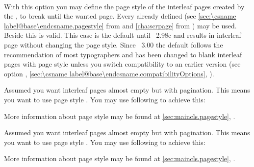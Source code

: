 \begin{Declaration}
  \\
\end{Declaration}%
%
%
With this option  you may define the page style of the
interleaf pages created by the , to break until the
wanted page. Every already defined  (see
\autoref{sec:\csname label@base\endcsname.pagestyle} from
 and
\autoref{cha:scrpage} from ) may be used. Beside this
 is valid. This case is the default
until \KOMAScript~2.98c and results in interleaf page without changing the
page style. Since \KOMAScript~3.00 the default
follows the recommendation of most typographers and has been changed to blank
interleaf pages with page style  unless you switch
compatibility to an earlier version (see option ,
\autoref{sec:\csname label@base\endcsname.compatibilityOptions},
).
\ifCommonmaincls
\begin{Example}
  \label{desc:maincls.option.cleardoublepage.example}
  Assumed you want interleaf pages almost empty but with pagination. This
  means you want to use page style . You may use following to
  achieve this:
\begin{lstcode}
\end{lstcode}
  More information about page style  may be found at
  \autoref{sec:maincls.pagestyle}, .
\end{Example}
\fi
\ifCommonscrextend
\begin{Example}
  \label{desc:scrextend.option.cleardoublepage.example}
  Assumed you want interleaf pages almost empty but with pagination. This
  means you want to use page style . You may use following to
  achieve this:
\begin{lstcode}
\end{lstcode}
  More information about page style  may be found at
  \autoref{sec:maincls.pagestyle}, .
\end{Example}
\fi
{}%


